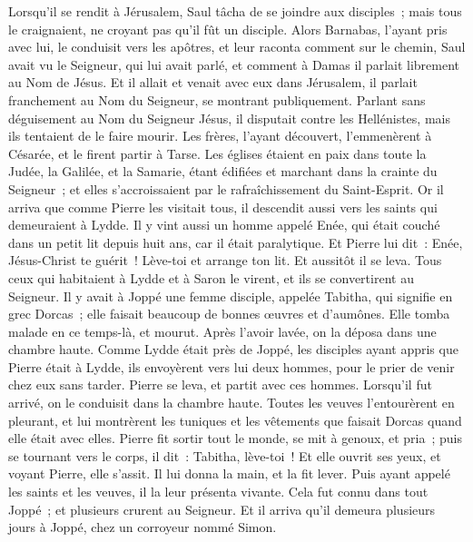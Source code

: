 \begin{multicols}{2}
Lorsqu'il se rendit à Jérusalem, Saul tâcha de se joindre aux disciples~; mais tous le craignaient, ne croyant pas qu'il fût un disciple.
Alors Barnabas, l'ayant pris avec lui, le conduisit vers les apôtres, et leur raconta comment sur le chemin, Saul avait vu le Seigneur, qui lui avait parlé, et comment à Damas il parlait librement au Nom de Jésus.
Et il allait et venait avec eux dans Jérusalem, il parlait franchement au Nom du Seigneur, se montrant publiquement.
Parlant sans déguisement au Nom du Seigneur Jésus, il disputait contre les Hellénistes, mais ils tentaient de le faire mourir.
Les frères, l'ayant découvert, l'emmenèrent à Césarée, et le firent partir à Tarse.
Les églises étaient en paix dans toute la Judée, la Galilée, et la Samarie, étant édifiées et marchant dans la crainte du Seigneur~; et elles s'accroissaient par le rafraîchissement du Saint-Esprit.
Or il arriva que comme Pierre les visitait tous, il descendit aussi vers les saints qui demeuraient à Lydde.
Il y vint aussi un homme appelé Enée, qui était couché dans un petit lit depuis huit ans, car il était paralytique.
Et Pierre lui dit~: Enée, Jésus-Christ te guérit~! Lève-toi et arrange ton lit. Et aussitôt il se leva.
Tous ceux qui habitaient à Lydde et à Saron le virent, et ils se convertirent au Seigneur.
Il y avait à Joppé une femme disciple, appelée Tabitha, qui signifie en grec Dorcas~; elle faisait beaucoup de bonnes œuvres et d'aumônes.
Elle tomba malade en ce temps-là, et mourut. Après l'avoir lavée, on la déposa dans une chambre haute.
Comme Lydde était près de Joppé, les disciples ayant appris que Pierre était à Lydde, ils envoyèrent vers lui deux hommes, pour le prier de venir chez eux sans tarder.
Pierre se leva, et partit avec ces hommes. Lorsqu'il fut arrivé, on le conduisit dans la chambre haute. Toutes les veuves l'entourèrent en pleurant, et lui montrèrent les tuniques et les vêtements que faisait Dorcas quand elle était avec elles.
Pierre fit sortir tout le monde, se mit à genoux, et pria~; puis se tournant vers le corps, il dit~: Tabitha, lève-toi~! Et elle ouvrit ses yeux, et voyant Pierre, elle s'assit.
Il lui donna la main, et la fit lever. Puis ayant appelé les saints et les veuves, il la leur présenta vivante.
Cela fut connu dans tout Joppé~; et plusieurs crurent au Seigneur.
Et il arriva qu'il demeura plusieurs jours à Joppé, chez un corroyeur nommé Simon.

\end{multicols}
